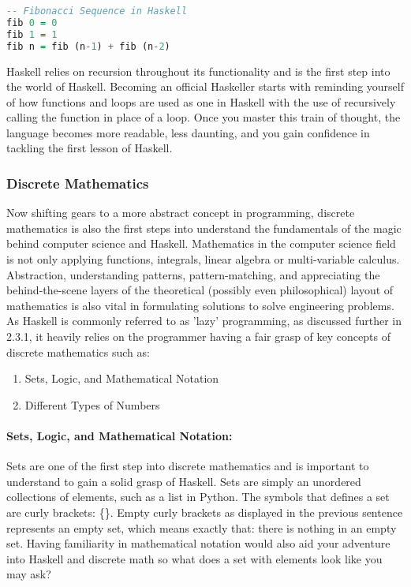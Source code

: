 \documentclass{article}
\begin{document}
\begin{lstlisting}[language=haskell]
-- Fibonacci Sequence in Haskell
fib 0 = 0
fib 1 = 1
fib n = fib (n-1) + fib (n-2)
\end{lstlisting}
\noindent
Haskell relies on recursion throughout its functionality and is the first step into the world of Haskell. Becoming an official Haskeller starts with reminding yourself of how functions and loops are used as one in Haskell with the use of recursively calling the function in place of a loop. Once you master this train of thought, the language becomes more readable, less daunting, and you gain confidence in tackling the first lesson of Haskell.

\subsubsection{Discrete Mathematics}

Now shifting gears to a more abstract concept in programming, discrete mathematics is also the first steps into understand the fundamentals of the magic behind computer science and Haskell. Mathematics in the computer science field is not only applying functions, integrals, linear algebra or multi-variable calculus. Abstraction, understanding patterns, pattern-matching, and appreciating the behind-the-scene layers of the theoretical (possibly even philosophical) layout of mathematics is also vital in formulating solutions to solve engineering problems. As Haskell is commonly referred to as 'lazy' programming, as discussed further in 2.3.1, it heavily relies on the programmer having a fair grasp of key concepts of discrete mathematics such as:

\begin{enumerate}
    \item Sets, Logic, and Mathematical Notation
    \item Different Types of Numbers
\end{enumerate}

\paragraph{Sets, Logic, and Mathematical Notation:}
Sets are one of the first step into discrete mathematics and is important to understand to gain a solid grasp of Haskell. Sets are simply an unordered collections of elements, such as a list in Python. The symbols that defines a set are curly brackets: \{\}. Empty curly brackets as displayed in the previous sentence represents an empty set, which means exactly that: there is nothing in an empty set. Having familiarity in mathematical notation would also aid your adventure into Haskell and discrete math so what does a set with elements look like you may ask?
\end{document}
